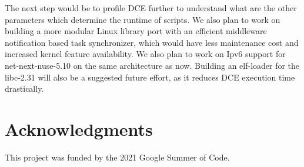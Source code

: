 \documentclass{sig-alternate}
\begin{document}
The next step would be to profile DCE further to understand what are the other parameters which determine 
the runtime of scripts. We also plan to work on building a more modular Linux library port with an efficient 
middleware notification based task synchronizer, which would have less maintenance cost and increased kernel feature availability.
 We also plan to work on Ipv6 support for net-next-nuse-5.10 on the same architecture as now. Building an elf-loader for the libc-2.31 will also be a 
 suggested future effort, as it reduces DCE execution time drastically.

\section{Acknowledgments}
This project was funded by the 2021 Google Summer of Code.
%

%
%
\end{document}
